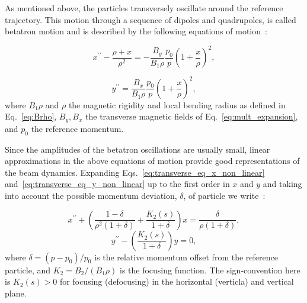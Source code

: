 As mentioned above, the particles transversely oscillate around the reference trajectory. This motion through a sequence of dipoles and quadrupoles, is called betatron motion and is described by the following equations of motion~\cite{Lee:1425444}: %

 \begin{equation}\label{eq:transverse_eq_x_non_linear}
   x^{\prime \prime} - \frac{\rho+x}{\rho^2} = - \frac{B_y}{B_1 \rho} \frac{p_0}{p} \left (  1+ \frac{x}{\rho} \right )^2, 
 \end{equation}

\begin{equation}\label{eq:transverse_eq_y_non_linear}
    y^{\prime \prime} = \frac{B_x}{B_1 \rho} \frac{p_0}{p}  \left (  1+ \frac{x}{\rho} \right )^2, 
\end{equation}
where $B_1 \rho$ and $\rho$ the magnetic rigidity and local bending radius as defined in Eq.~\eqref{eq:Brho},  $B_y, B_x$ the transverse magnetic fields of Eq.~\eqref{eq:mult_expansion}, and $p_0$ the reference momentum.

Since the amplitudes of the betatron oscillations are usually small, linear approximations in the above equations of motion provide good representations of the beam dynamics. Expanding Eqs.~\eqref{eq:transverse_eq_x_non_linear} and~\eqref{eq:transverse_eq_y_non_linear} up to the first order in $x$ and $y$ and taking into account the possible momentum deviation, $\delta$, of particle we write~\cite{Lee:1425444}: %

\begin{equation}\label{eq:eq_of_motion_horizontal_linear}
    x^{\prime \prime} + \left (  \frac{1-\delta}{\rho^2 (1+\delta)}  + \frac{K_2(s)}{1+\delta} \right )x = \frac{\delta}{\rho (1+\delta)}, 
\end{equation}
\begin{equation}\label{eq:eq_of_motion_vertical_linear}
    y^{\prime \prime} -  \left ( \frac{K_2(s)}{1+\delta} \right ) y = 0,
\end{equation}
where $\delta = (p-p_0)/p_0$ is the relative momentum offset from the reference particle, and $K_2=B_2 /(B_1\rho)$ is the focusing function. The sign-convention here is $K_2(s)>0$ for focusing (defocusing) in the horizontal (verticla) and vertical plane.

